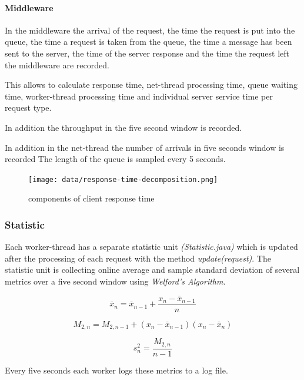 \documentclass[11pt,a4paper]{article}
\begin{document}
\paragraph{Middleware}

In the middleware the arrival of the request, the time the request is put into the queue, the time a request is taken from the queue, the time a message has been sent to the server, the time of the server response and the time the request left the middleware are recorded.

This allows to calculate response time, net-thread processing time, queue waiting time, worker-thread processing time and individual server service time per request type.

In addition the throughput in the five second window is recorded.


In addition in the net-thread the number of arrivals in five seconds window is recorded
The length of the queue is sampled every 5 seconds.

\begin{figure}
	\centering
	\texttt{[image: data/response-time-decomposition.png]}
	\caption{components of client response time}
\end{figure}

\subsubsection{Statistic}

Each worker-thread has a separate statistic unit \emph{(Statistic.java)} which is updated after the processing of each request with the method \emph{update(request)}.  
The statistic unit is collecting online average and sample standard deviation of several metrics over a five second window using \emph{Welford's Algorithm}.\cite{Knuth:1997:ACP:270146}

\begin{equation}
	\bar{x}_n = \bar{x}_{n-1} + \frac{x_n -\bar{x}_{n-1}}{n}
\end{equation}

\begin{equation}
	M_{2,n} = M_{2,n-1} + (x_n - \bar{x}_{n-1})(x_n - \bar{x}_n)
\end{equation}

\begin{equation}
	s^2_n = \frac{M_{2,n}}{n-1}
\end{equation}

Every five seconds each worker logs these metrics to a log file.
\end{document}
